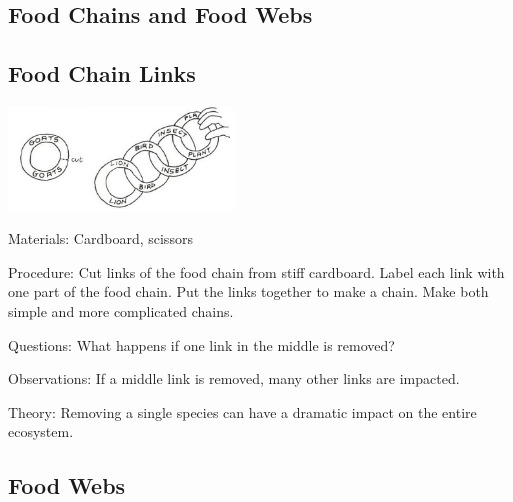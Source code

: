 \begin{multicols}{2}
\columnbreak


\section*{Food Chains and Food Webs}  


\subsection{Food Chain Links} %

\begin{center}
\includegraphics[width=0.45\textwidth]{./img/vso/food-chain-links.jpg}
\end{center}

\begin{description*}
\item[Materials:]{Cardboard, scissors}
\item[Procedure:]{Cut links of the food chain from
stiff cardboard. Label each link
with one part of the food chain.
Put the links together to make a
chain. Make both simple and more complicated chains.}
\item[Questions:]{What happens if one link in the middle is removed?}
\item[Observations:]{If a middle link is removed, many other links are impacted.}
\item[Theory:]{Removing a single species can have a dramatic impact on the entire ecosystem.}
\end{description*}

\subsection{Food Webs} %


\end{multicols}
